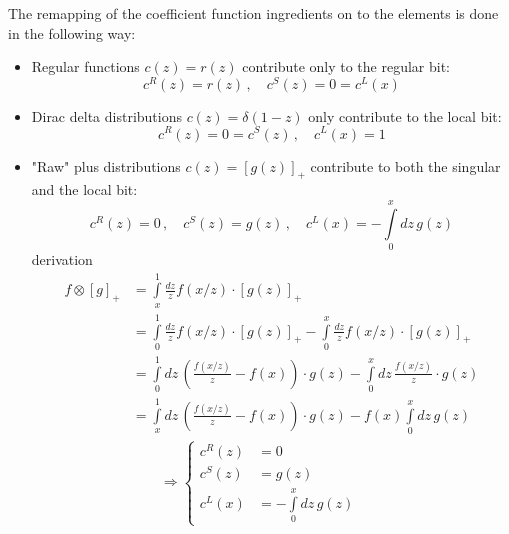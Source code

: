 The remapping of the coefficient function ingredients on to the \rsl elements
is done in the following way:
\begin{itemize}
  \item Regular functions $c(z) = r(z)$ contribute only to the regular bit:
    \begin{equation}
      c^R(z) = r(z)\,,\quad c^S(z) = 0 = c^L(x)
    \end{equation}

  \item Dirac delta distributions $c(z) = \delta(1-z)$ only contribute to
    the local bit:
    \begin{equation}
      c^R(z) = 0 = c^S(z)\,,\quad c^L(x) = 1
    \end{equation}

  \item "Raw" plus distributions $c(z) = \left[g(z)\right]_+$ contribute to
    both the singular and the local bit:
    \begin{equation}
      c^R(z) = 0\,,\quad c^S(z) = g(z)\,,\quad c^L(x) = -\int\limits_0^x\!dz\, g(z)
    \end{equation}
    derivation
    \begin{align}
        f \otimes [g]_+ &= \int\limits_x^1 \frac{dz}{z} f(x/z) \cdot \left[ g(z) \right]_+\\
          &= \int\limits_0^1 \frac{dz}{z} f(x/z) \cdot \left[ g(z) \right]_+ - \int\limits_0^x \frac{dz}{z} f(x/z) \cdot \left[ g(z) \right]_+\\
          &= \int\limits_0^1\!dz\, \left(\frac{f(x/z)}{z} - f(x)\right) \cdot g(z) - \int\limits_0^x\!dz\, \frac{f(x/z)}{z} \cdot g(z)\\
          &= \int\limits_x^1\!dz\, \left(\frac{f(x/z)}{z} - f(x)\right) \cdot g(z) - f(x) \int\limits_0^x\!dz\, g(z)\\
          &\qquad\Rightarrow
          \begin{cases}
            c^R(z) &= 0\\
            c^S(z) &= g(z)\\
            c^L(x) &= -\int\limits_0^x\!dz\, g(z)
          \end{cases}
    \end{align}


\end{itemize}
